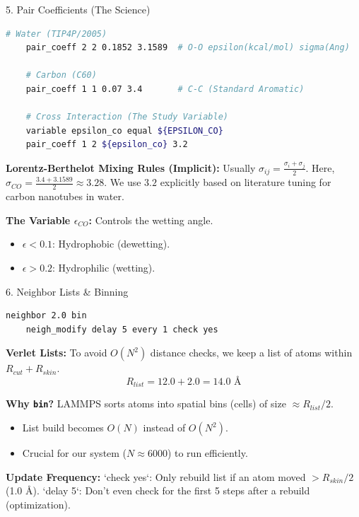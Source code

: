 \documentclass[aspectratio=169, 10pt]{beamer}
\begin{document}
\begin{frame}[fragile]{5. Pair Coefficients (The Science)}
    \begin{lstlisting}[language=bash]
    # Water (TIP4P/2005)
    pair_coeff 2 2 0.1852 3.1589  # O-O epsilon(kcal/mol) sigma(Ang)
    
    # Carbon (C60)
    pair_coeff 1 1 0.07 3.4       # C-C (Standard Aromatic)
    
    # Cross Interaction (The Study Variable)
    variable epsilon_co equal ${EPSILON_CO}
    pair_coeff 1 2 ${epsilon_co} 3.2
    \end{lstlisting}

    \textbf{Lorentz-Berthelot Mixing Rules (Implicit):}
    Usually $\sigma_{ij} = \frac{\sigma_i + \sigma_j}{2}$.
    Here, $\sigma_{CO} = \frac{3.4 + 3.1589}{2} \approx 3.28$. We use $3.2$ explicitly based on literature tuning for carbon nanotubes in water.
    
    \textbf{The Variable $\epsilon_{CO}$:}
    Controls the wetting angle.
    \begin{itemize}
        \item $\epsilon < 0.1$: Hydrophobic (dewetting).
        \item $\epsilon > 0.2$: Hydrophilic (wetting).
    \end{itemize}
\end{frame}

\begin{frame}[fragile]{6. Neighbor Lists \& Binning}
    \begin{lstlisting}[language=bash]
    neighbor 2.0 bin
    neigh_modify delay 5 every 1 check yes
    \end{lstlisting}

    \textbf{Verlet Lists:}
    To avoid $O(N^2)$ distance checks, we keep a list of atoms within $R_{cut} + R_{skin}$.
    \begin{equation}
        R_{list} = 12.0 + 2.0 = 14.0 \text{ \AA}
    \end{equation}
    
    \textbf{Why \texttt{bin}?}
    LAMMPS sorts atoms into spatial bins (cells) of size $\approx R_{list}/2$.
    \begin{itemize}
        \item List build becomes $O(N)$ instead of $O(N^2)$.
        \item Crucial for our system ($N \approx 6000$) to run efficiently.
    \end{itemize}
    
    \textbf{Update Frequency:}
    `check yes`: Only rebuild list if an atom moved $> R_{skin}/2$ (1.0 \AA).
    `delay 5`: Don't even check for the first 5 steps after a rebuild (optimization).
\end{frame}
\end{document}
